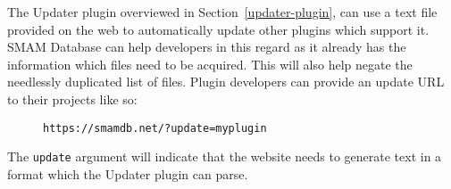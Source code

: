 The Updater plugin overviewed in Section~\ref{updater-plugin}, can use a text file provided on the web to automatically update other plugins which support it.
SMAM Database can help developers in this regard as it already has the information which files need to be acquired.
This will also help negate the needlessly duplicated list of files.
Plugin developers can provide an update URL to their projects like so:

\begin{figure}[htp]
\centering
\verb|https://smamdb.net/?update=myplugin|
\end{figure}

The \verb|update| argument will indicate that the website needs to generate text in a format which the Updater plugin can parse.
